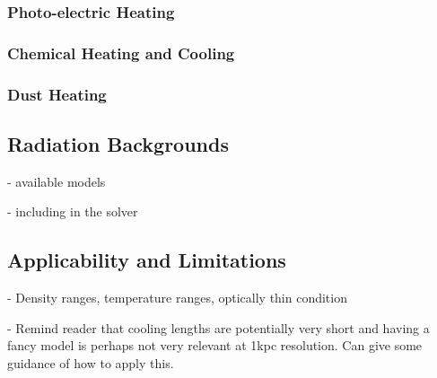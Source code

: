 \subsubsection{Photo-electric Heating}


\subsubsection{Chemical Heating and Cooling}


\subsubsection{Dust Heating}



\subsection{Radiation Backgrounds}
- available models

- including in the solver


\subsection{Applicability and Limitations}
- Density ranges, temperature ranges, optically thin condition

- Remind reader that cooling lengths are potentially very short and
having a fancy model is perhaps not very relevant at 1kpc
resolution. Can give some guidance of how to apply this.

